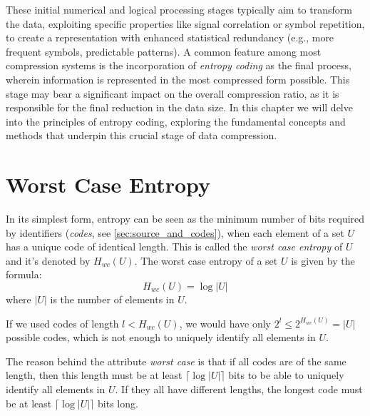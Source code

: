 \noindent These initial numerical and logical processing stages typically aim to transform the data, exploiting specific properties like signal correlation or symbol repetition, to create a representation with enhanced statistical redundancy (e.g., more frequent symbols, predictable patterns). A common feature among most compression systems is the incorporation of \emph{entropy coding} as the final process, wherein information is represented in the most compressed form possible. This stage may bear a significant impact on the overall compression ratio, as it is responsible for the final reduction in the data size. In this chapter we will delve into the principles of entropy coding, exploring the fundamental concepts and methods that underpin this crucial stage of data compression.

\section{Worst Case Entropy} \label{sec:worst_case_entropy}
In its simplest form, entropy can be seen as the minimum number of bits required by identifiers (\emph{codes}, see \autoref{sec:source_and_codes}), when each element of a set $U$ has a unique code of identical length. This is called the \emph{worst case entropy} of $U$ and it's denoted by $H_{wc}(U)$. The worst case entropy of a set $U$ is given by the formula:
\begin{equation}
    H_{wc}(U) =  \log |U|
\end{equation}
where $|U|$ is the number of elements in $U$.

\begin{remark}
    If we used codes of length $l < H_{wc} (U)$, we would have only $2^l \leq 2^{H_{wc}(U)} = |U|$ possible codes, which is not enough to uniquely identify all elements in $U$.
\end{remark}

\noindent The reason behind the attribute \emph{worst case} is that if all codes are of the same length, then this length must be at least $\lceil \log |U| \rceil$ bits to be able to uniquely identify all elements in $U$. If they all have different lengths, the longest code must be at least $\lceil \log |U| \rceil$ bits long.


